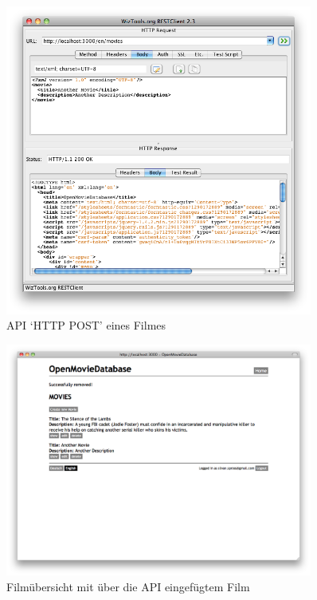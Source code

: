 \begin{figure}[ht]
    \begin{center}
        \includegraphics[width=0.9\textwidth,angle=0]{./bilder/tests/test_schnittstelle_03.png}
        \caption{API `HTTP POST' eines Filmes}
        \label{test_schnittstelle_03}
    \end{center}
\end{figure}

\begin{figure}[ht]
    \begin{center}
        \includegraphics[width=0.9\textwidth,angle=0]{./bilder/tests/test_schnittstelle_04.png}
        \caption{Filmübersicht mit über die API eingefügtem Film}
        \label{test_schnittstelle_04}
    \end{center}
\end{figure}

